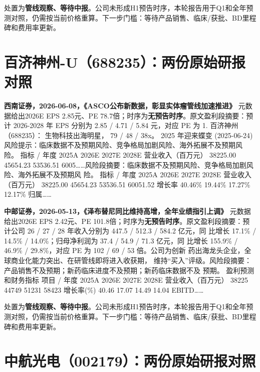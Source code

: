 \begin{keyinsight}[AStock处理]
处置为\textbf{管线观察、等待中报}。公司未形成H1预告时序，本轮报告用于Q1和全年预测对照，仍需按当前价格重算。下一步门槛：等待产品销售、临床/获批、BD里程碑和费用率更新。
\end{keyinsight}

\section{百济神州-U（688235）：两份原始研报对照}

\textbf{西南证券，2026-06-08，《ASCO公布新数据，彰显实体瘤管线加速推进》}
元数据给出2026E EPS 2.85元、PE 78.7倍；时序为\textbf{无预告时序}。原文盈利段摘要：预计 2026-2028 年 EPS 分别为 2.85 / 4.71 / 5.84 元，对应 PE 为 1. 百济神州 （688235）： 生物科技出海明星， 79 / 48 / 38x。 2025 年迎来蝶变 (2025-06-24) 风险提示：临床数据不及预期风险、竞争格局加剧风险、海外拓展不及预期风 险。 指标 / 年度 2025A 2026E 2027E 2028E 营业收入（百万元） 38225.00 45654.23 53536.51 6005……风险段摘要：临床数据不及预期风险、竞争格局加剧风险、海外拓展不及预期风 险。 指标 / 年度 2025A 2026E 2027E 2028E 营业收入（百万元） 38225.00 45654.23 53536.51 60051.52 增长率 40.46\% 19.44\% 17.27\% 12.17\% 归属……

\textbf{中邮证券，2026-05-13，《泽布替尼同比维持高增，全年业绩指引上调》}
元数据给出2026E EPS 2.42元、PE 101.8倍；时序为\textbf{无预告时序}。原文盈利段摘要：预计公司 26 / 27 / 28 年收入分别为 447.5 / 512.3 / 584.2 亿元，同 比增长 17.1\% / 14.5\% / 14.0\%；归母净利润为 37.4 / 54.9 / 71.3 亿元，同 比增长 155.9\% / 46.9\% / 29.8\%，对应 PE 为 102 / 69 / 53 倍。公司为创新 药出海龙头企业，全球商业化能力突出、在研管线即将进入收获期， 维持“买入”评级。风险段摘要：产品销售不及预期；新药临床进度不及预期；新药临床数据不及 预期。 盈利预测和财务指标 项目 / 年度 2025A 2026E 2027E 2028E 营业收入（百万元） 38225 44749 51231 58423 增长率(\%) 40.46 17.07 14.49 14.04 EBITD……

\begin{keyinsight}[AStock处理]
处置为\textbf{管线观察、等待中报}。公司未形成H1预告时序，本轮报告用于Q1和全年预测对照，仍需按当前价格重算。下一步门槛：等待产品销售、临床/获批、BD里程碑和费用率更新。
\end{keyinsight}

\section{中航光电（002179）：两份原始研报对照}

